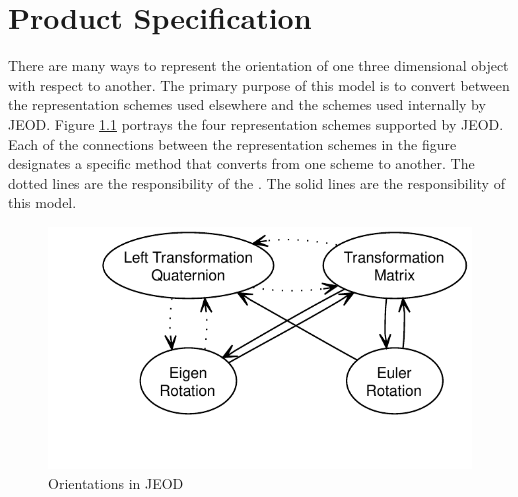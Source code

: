 
\chapter{Product Specification}\label{ch:spec}

There are many ways to represent the orientation of one three dimensional
object with respect to another. The primary purpose of this model is to
convert between the representation schemes used elsewhere and the schemes
used internally by JEOD.
Figure \ref{fig:representations} portrays the four representation schemes
supported by JEOD. Each of the connections between the representation schemes
in the figure designates a specific method that converts from one scheme
to another. The dotted lines are the responsibility of the \QUATERNION.
The solid lines are the responsibility of this model.

\begin{figure}[hbtp]
\centering
\includegraphics{representations}
\caption{Orientations in JEOD}
\label{fig:representations}
\end{figure}

